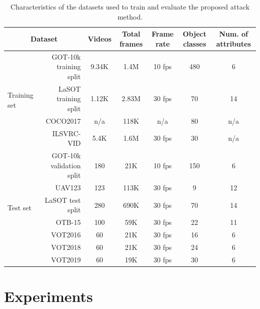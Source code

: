 \documentclass[journal]{IEEEtran}
\begin{document}
\begin{table}[t]
  \centering
  \caption{Characteristics of the datasets used to train and evaluate the proposed attack method.}
  \begin{tabular}{lrccccc} \toprule
  \multicolumn{2}{c}{Dataset}                            & Videos & Total frames & Frame rate & Object classes & Num. of attributes \\ \midrule
  \multirow{4}{*}{Training set} & GOT-10k training split & 9.34K  & 1.4M        & 10 fps     & 480            & 6                  \\
                                & LaSOT training split   & 1.12K  & 2.83M        & 30 fps     & 70             & 14                 \\
                                & COCO2017               & n/a    & 118K         & n/a        & 80             & n/a                \\
                                & ILSVRC-VID             & 5.4K   & 1.6M         & 30 fps     & 30             & n/a                \\ \midrule
  \multirow{7}{*}{Test set}     & GOT-10k validation split& 180   & 21K          & 10 fps     & 150            & 6                  \\
                                & UAV123                 & 123    & 113K         & 30 fps     & 9              & 12                 \\
                                & LaSOT test split       & 280    & 690K         & 30 fps     & 70             & 14                 \\
                                & OTB-15                 & 100    & 59K          & 30 fps     & 22             & 11                 \\
                                & VOT2016                & 60     & 21K          & 30 fps     & 16             & 6                  \\
                                & VOT2018                & 60     & 21K          & 30 fps     & 24             & 6                  \\ 
                                & VOT2019                & 60     & 19K          & 30 fps     & 30             & 6                  \\ \bottomrule
  \end{tabular}
  \label{tab:dataset}
\end{table}

\section{Experiments}
\end{document}
